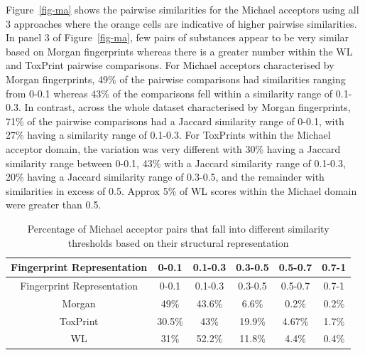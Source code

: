 \documentclass[
  super,
  preprint,
  3p]{elsarticle}
\begin{document}
Figure~\ref{fig-ma} shows the pairwise similarities for the Michael
acceptors using all 3 approaches where the orange cells are indicative
of higher pairwise similarities. In panel 3 of Figure~\ref{fig-ma}, few
pairs of substances appear to be very similar based on Morgan
fingerprints whereas there is a greater number within the WL and
ToxPrint pairwise comparisons. For Michael acceptors characterised by
Morgan fingerprints, 49\% of the pairwise comparisons had similarities
ranging from 0-0.1 whereas 43\% of the comparisons fell within a
similarity range of 0.1-0.3. In contrast, across the whole dataset
characterised by Morgan fingerprints, 71\% of the pairwise comparisons
had a Jaccard similarity range of 0-0.1, with 27\% having a similarity
range of 0.1-0.3. For ToxPrints within the Michael acceptor domain, the
variation was very different with 30\% having a Jaccard similarity range
between 0-0.1, 43\% with a Jaccard similarity range of 0.1-0.3, 20\%
having a Jaccard similarity range of 0.3-0.5, and the remainder with
similarities in excess of 0.5. Approx 5\% of WL scores within the
Michael domain were greater than 0.5.

\begin{longtable}[]{@{}cccccc@{}}
\caption{Percentage of Michael acceptor pairs that fall into different
similarity thresholds based on their structural
representation}\tabularnewline
\toprule\noalign{}
Fingerprint Representation & 0-0.1 & 0.1-0.3 & 0.3-0.5 & 0.5-0.7 &
0.7-1 \\
\midrule\noalign{}
\endfirsthead
\toprule\noalign{}
Fingerprint Representation & 0-0.1 & 0.1-0.3 & 0.3-0.5 & 0.5-0.7 &
0.7-1 \\
\midrule\noalign{}
\endhead
\bottomrule\noalign{}
\endlastfoot
Morgan & 49\% & 43.6\% & 6.6\% & 0.2\% & 0.2\% \\
ToxPrint & 30.5\% & 43\% & 19.9\% & 4.67\% & 1.7\% \\
WL & 31\% & 52.2\% & 11.8\% & 4.4\% & 0.4\% \\
\end{longtable}
\end{document}

